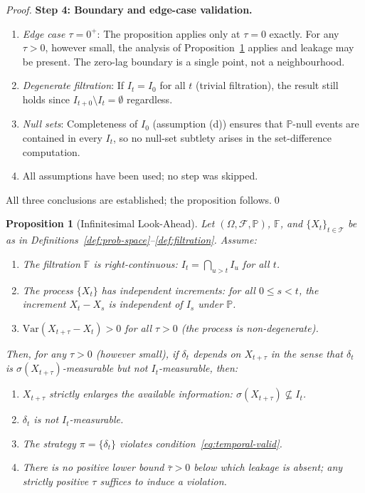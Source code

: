 \documentclass[12pt,openany]{book}
\newcommand{\calI}{\mathcal{I}}
\numberwithin{equation}{chapter}
\theoremstyle{plain}
\newtheorem{proposition}[theorem]{Proposition}
\theoremstyle{definition}
\theoremstyle{remark}
\numberwithin{equation}{chapter}
\theoremstyle{plain}
\def\calI{I}%
\begin{document}
\begin{proof}
\medskip
\noindent\textbf{Step 4: Boundary and edge-case validation.}
\begin{enumerate}
  \item \emph{Edge case $\tau = 0^+$}: The proposition applies
        only at $\tau = 0$ exactly.  For any $\tau > 0$, however
        small, the analysis of Proposition~\ref{prop:infinitesimal}
        applies and leakage may be present.  The zero-lag boundary
        is a single point, not a neighbourhood.
  \item \emph{Degenerate filtration}: If $\calI_t = \calI_0$ for
        all $t$ (trivial filtration), the result still holds
        since $\calI_{t+0} \setminus \calI_t = \emptyset$
        regardless.
  \item \emph{Null sets}: Completeness of $\calI_0$ (assumption
        (d)) ensures that $\mathbb{P}$-null events are contained
        in every $\calI_t$, so no null-set subtlety arises in the
        set-difference computation.
  \item All assumptions have been used; no step was skipped.
\end{enumerate}

All three conclusions are established; the proposition follows.\qed
\end{proof}

\begin{proposition}[Infinitesimal Look-Ahead]
\label{prop:infinitesimal}
Let $(\Omega, \mathcal{F}, \mathbb{P})$, $\mathbb{F}$, and
$\{X_t\}_{t \in \mathcal{T}}$ be as in
Definitions~\ref{def:prob-space}--\ref{def:filtration}.  Assume:
\begin{enumerate}
  \item[(A1)] The filtration $\mathbb{F}$ is right-continuous:
        $\calI_t = \bigcap_{u > t} \calI_u$ for all $t$.
  \item[(A2)] The process $\{X_t\}$ has independent increments: for
        all $0 \leq s < t$, the increment $X_t - X_s$ is
        independent of $\calI_s$ under $\mathbb{P}$.
  \item[(A3)] $\mathrm{Var}(X_{t+\tau} - X_t) > 0$ for all
        $\tau > 0$ (the process is non-degenerate).
\end{enumerate}
Then, for any $\tau > 0$ (however small), if $\delta_t$ depends
on $X_{t+\tau}$ in the sense that $\delta_t$ is
$\sigma(X_{t+\tau})$-measurable but not $\calI_t$-measurable,
then:
\begin{enumerate}
  \item[(i)] $X_{t+\tau}$ strictly enlarges the available
        information: $\sigma(X_{t+\tau}) \not\subseteq \calI_t$.
  \item[(ii)] $\delta_t$ is not $\calI_t$-measurable.
  \item[(iii)] The strategy $\pi = \{\delta_t\}$ violates
        condition~\eqref{eq:temporal-valid}.
  \item[(iv)] There is no positive lower bound $\bar{\tau} > 0$
        below which leakage is absent; any strictly positive
        $\tau$ suffices to induce a violation.
\end{enumerate}
\end{proposition}
\end{document}
